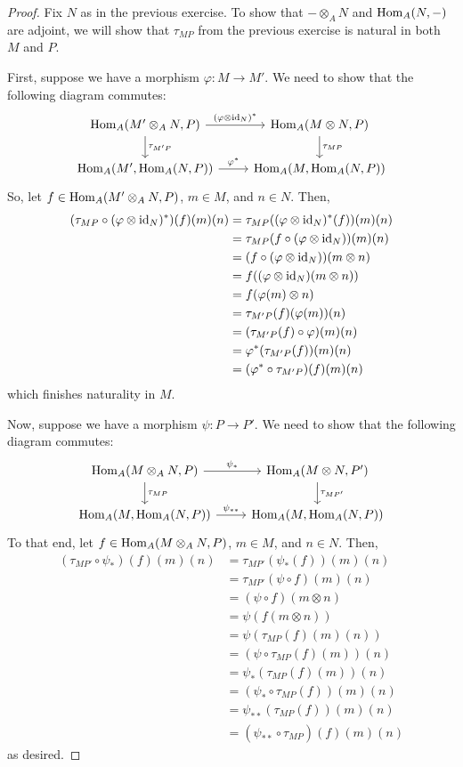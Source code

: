 \documentclass[12pt]{exam}
\begin{document}
\begin{proof}
	Fix $N$ as in the previous exercise. To show that $- \otimes_A N$ and $\operatorname{Hom}_A(N,-)$ are adjoint, we will show that $\tau_{MP}$ from the previous exercise is natural in both $M$ and $P$.
	
	First, suppose we have a morphism $\varphi : M \to M'$. We need to show that the following diagram commutes:
	\[ \begin{tikzcd} \Hom_A(M' \otimes_A N,P) \arrow[r,"(\varphi \otimes \id_N)^\ast"] \arrow[d,"\tau_{M'P}"] & \Hom_A(M \otimes N,P) \arrow[d,"\tau_{MP}"] \\ \Hom_A(M',\Hom_A(N,P)) \arrow[r,"\varphi^\ast"] & \Hom_A(M,\Hom_A(N,P)) \end{tikzcd} \]
	So, let $f \in \operatorname{Hom}_A(M' \otimes_A N,P)$, $m \in M$, and $n \in N$. Then,
	\begin{align*}
	(\tau_{MP} \circ (\varphi \otimes \operatorname{id}_N)^\ast)(f)(m)(n)
		&= \tau_{MP}((\varphi \otimes \operatorname{id}_N)^\ast(f))(m)(n) \\
		&= \tau_{MP}(f \circ (\varphi \otimes \operatorname{id}_N))(m)(n) \\
		&= (f \circ (\varphi \otimes \operatorname{id}_N))(m \otimes n) \\
		&= f((\varphi \otimes \operatorname{id}_N)(m \otimes n)) \\
		&= f(\varphi(m) \otimes n) \\
		&= \tau_{M'P}(f)(\varphi(m))(n) \\
		&= (\tau_{M'P}(f) \circ \varphi)(m)(n) \\
		&= \varphi^\ast(\tau_{M'P}(f))(m)(n) \\
		&= (\varphi^\ast \circ \tau_{M'P})(f)(m)(n)
	\end{align*}
	which finishes naturality in $M$.
	
	Now, suppose we have a morphism $\psi : P \to P'$. We need to show that the following diagram commutes:
	\[ \begin{tikzcd} \Hom_A(M \otimes_A N,P) \arrow[r,"\psi_\ast"] \arrow[d,"\tau_{MP}"] & \Hom_A(M \otimes N,P') \arrow[d,"\tau_{MP'}"] \\ \Hom_A(M,\Hom_A(N,P)) \arrow[r,"\psi_{\ast\ast}"] & \Hom_A(M,\Hom_A(N,P)) \end{tikzcd} \]
	To that end, let $f \in \operatorname{Hom}_A(M \otimes_A N,P)$, $m \in M$, and $n \in N$. Then,
	\begin{align*}
	(\tau_{MP'} \circ \psi_\ast)(f)(m)(n)
		&= \tau_{MP'}(\psi_\ast(f))(m)(n) \\
		&= \tau_{MP'}(\psi \circ f)(m)(n) \\
		&= (\psi \circ f)(m \otimes n) \\
		&= \psi(f(m \otimes n)) \\
		&= \psi(\tau_{MP}(f)(m)(n)) \\
		&= (\psi \circ \tau_{MP}(f)(m))(n) \\
		&= \psi_\ast(\tau_{MP}(f)(m))(n) \\
		&= (\psi_\ast \circ \tau_{MP}(f))(m)(n) \\
		&= \psi_{\ast\ast}(\tau_{MP}(f))(m)(n) \\
		&= (\psi_{\ast\ast} \circ \tau_{MP})(f)(m)(n)
	\end{align*}
	as desired.
\end{proof}
\end{document}
